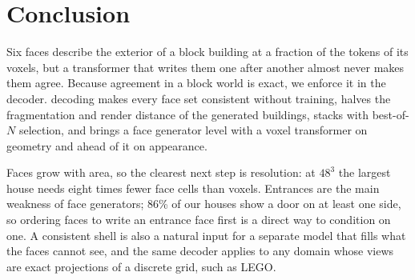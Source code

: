 \section{Conclusion}
\label{sec:conclusion}

Six faces describe the exterior of a block building at a fraction of the tokens of its voxels, but a
transformer that writes them one after another almost never makes them agree. Because agreement in a
block world is exact, we enforce it in the decoder. \cfd{} decoding makes every face set consistent
without training, halves the fragmentation and render distance of the generated buildings, stacks
with best-of-$N$ selection, and brings a face generator level with a voxel transformer on geometry and
ahead of it on appearance.

Faces grow with area, so the clearest next step is resolution: at $48^3$ the largest house needs
eight times fewer face cells than voxels. Entrances are the main weakness of face generators; 86\% of
our houses show a door on at least one side, so ordering faces to write an entrance face first is a
direct way to condition on one. A consistent shell is also a natural input for a separate model that
fills what the faces cannot see, and the same decoder applies to any domain whose views are exact
projections of a discrete grid, such as LEGO.
